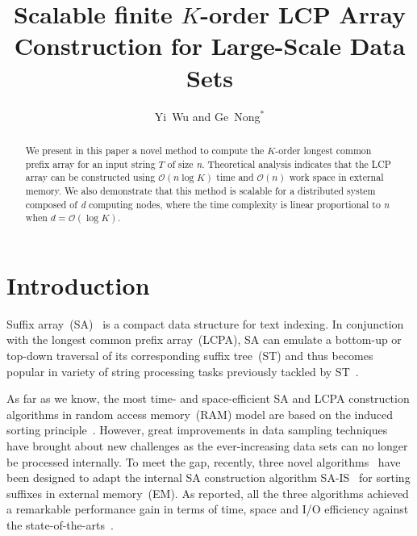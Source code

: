 \documentclass{llncs}
\begin{document}
\title{Scalable finite $K$-order {LCP} Array Construction for Large-Scale Data Sets}

\author{Yi~Wu and Ge~Nong$^*$}

\maketitle

\begin{abstract}
We present in this paper a novel method to compute the  $K$-order longest common prefix array for an input string $T$ of size {\em n}. Theoretical analysis indicates that the {LCP} array can be constructed using $\mathcal{O}(n\log K)$ time and $\mathcal{O}(n)$ work space in external memory. We also demonstrate that this method is scalable for a distributed system composed of {\em d} computing nodes, where the time complexity is linear proportional to {\em n} when $d=\mathcal{O}(\log K)$.
\end{abstract}

\section{Introduction}

Suffix array~({SA})~\cite{Manber1993} is a compact data structure for text indexing. In conjunction with the longest common prefix array~({LCPA}), {SA} can emulate a bottom-up or top-down traversal of its corresponding suffix tree~({ST}) and thus becomes popular in variety of string processing tasks previously tackled by {ST}~\cite{Abouelhodaa2004}.

As far as we know, the most time- and space-efficient SA and {LCPA} construction algorithms in random access memory~(RAM) model are based on the induced sorting principle~\cite{nong2011,Fischer11}. However, great improvements in data sampling techniques have brought about new challenges as the ever-increasing data sets can no longer be processed internally. To meet the gap, recently, three novel algorithms~\cite{Nong15, Bingmann-Code12, Nong14} have been designed to adapt the internal {SA} construction algorithm {SA-IS}~\cite{nong2011} for sorting suffixes in external memory~(EM). As reported, all the three algorithms achieved a remarkable performance gain in terms of time, space and I/O efficiency against the state-of-the-arts~\cite{Dementiev08}.
\end{document}
